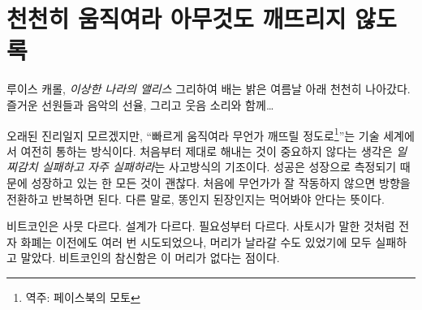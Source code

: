 \chapter{천천히 움직여라 아무것도 깨뜨리지 않도록}
\label{les:18}

\begin{chapquote}{루이스 캐롤, \textit{이상한 나라의 앨리스}}
	그리하여 배는 밝은 여름날 아래 천천히 나아갔다. 즐거운 선원들과 음악의 선율, 그리고 웃음 소리와 함께\ldots
\end{chapquote}

\begin{comment}
	It might be a dead mantra, but \enquote{move fast and break things} is still how
	much of the tech world operates. The idea that it doesn't matter if you
	get things right the first time is a basic pillar of the \textit{fail early,
		fail often} mentality. Success is measured in growth, so as long as you
	are growing everything is fine. If something doesn't work at first you
	simply pivot and iterate. In other words: throw enough shit against the
	wall and see what sticks.
\end{comment}
오래된 진리일지 모르겠지만, \enquote{빠르게 움직여라 무언가 깨뜨릴 정도로\footnote{역주: 페이스북의 모토}}는 기술 세계에서 여전히 통하는 방식이다.
처음부터 제대로 해내는 것이 중요하지 않다는 생각은 \textit{일찌감치 실패하고 자주 실패하라}는 사고방식의 기조이다.
성공은 성장으로 측정되기 때문에 성장하고 있는 한 모든 것이 괜찮다. 
처음에 무언가가 잘 작동하지 않으면 방향을 전환하고 반복하면 된다. 
다른 말로, 똥인지 된장인지는 먹어봐야 안다는 뜻이다.

\begin{comment}
	Bitcoin is very different. It is different by design. It is different
	out of necessity. As Satoshi pointed out, e-currency has been tried
	many times before, and all previous attempts have failed because there
	was a head which could be cut off. The novelty of Bitcoin is that it is
	a beast without heads.
\end{comment}
비트코인은 사뭇 다르다. 설계가 다르다. 필요성부터 다르다.
사토시가 말한 것처럼 전자 화폐는 이전에도 여러 번 시도되었으나, 머리가 날라갈 수도 있었기에 모두 실패하고 말았다.
비트코인의 참신함은 이 머리가 없다는 점이다.

